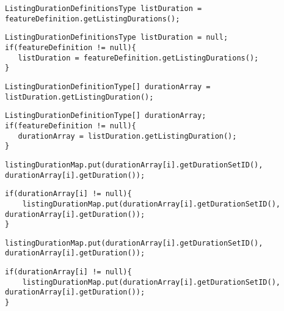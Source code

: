 \begin{lstlisting}[firstnumber=130, caption={getListingDurations invocation}]
ListingDurationDefinitionsType listDuration = featureDefinition.getListingDurations();
\end{lstlisting}
\begin{lstlisting}[firstnumber=130, caption={getListingDurations invocation possible solution}]
ListingDurationDefinitionsType listDuration = null;
if(featureDefinition != null){
   listDuration = featureDefinition.getListingDurations();
}
\end{lstlisting}
\noindent\makebox[\linewidth]{\rule{\linewidth}{0.4pt}}

\begin{lstlisting}[firstnumber=131, caption={getListingDuration invocation}]
ListingDurationDefinitionType[] durationArray = listDuration.getListingDuration();
\end{lstlisting}
\begin{lstlisting}[firstnumber=131, caption={getListingDuration invocation possible solution}]
ListingDurationDefinitionType[] durationArray;
if(featureDefinition != null){
   durationArray = listDuration.getListingDuration();
}
\end{lstlisting}
\noindent\makebox[\linewidth]{\rule{\linewidth}{0.4pt}}

\begin{lstlisting}[firstnumber=134, caption={getDuration invocation}]
listingDurationMap.put(durationArray[i].getDurationSetID(), durationArray[i].getDuration());
\end{lstlisting}
\begin{lstlisting}[firstnumber=134, caption={getDuration invocation possible solution}]
if(durationArray[i] != null){
    listingDurationMap.put(durationArray[i].getDurationSetID(), durationArray[i].getDuration());
}
\end{lstlisting}
\noindent\makebox[\linewidth]{\rule{\linewidth}{0.4pt}}

\begin{lstlisting}[firstnumber=134, caption={getDurationSetID invocation}]
listingDurationMap.put(durationArray[i].getDurationSetID(), durationArray[i].getDuration());
\end{lstlisting}
\begin{lstlisting}[firstnumber=134, caption={getDurationSetID invocation possible solution}]
if(durationArray[i] != null){
    listingDurationMap.put(durationArray[i].getDurationSetID(), durationArray[i].getDuration());
}
\end{lstlisting}
\noindent\makebox[\linewidth]{\rule{\linewidth}{0.4pt}}

